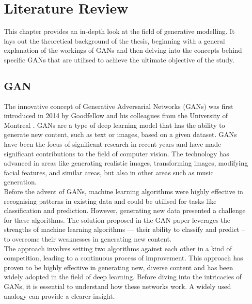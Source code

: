 \newpage
\section{Literature Review}
\label{section:literatureReviewChapter}
This chapter provides an in-depth look at the field of generative modelling. It lays out the theoretical background of the thesis, beginning with a general explanation of the workings of GANs and then delving into the concepts behind specific GANs that are utilised to achieve the ultimate objective of the study.

\subsection{GAN}
The innovative concept of Generative Adversarial Networks (GANs) was first introduced in 2014 by Goodfellow and his colleagues from the University of Montreal \cite{GANGoodfellow}. GANs are a type of deep learning model that has the ability to generate new content, such as text or images, based on a given dataset. GANs have been the focus of significant research in recent years and have made significant contributions to the field of computer vision. The technology has advanced in areas like generating realistic images, transforming images, modifying facial features, and similar areas, but also in other areas such as music generation.\\
Before the advent of GANs, machine learning algorithms were highly effective in recognising patterns in existing data and could be utilised for tasks like classification and prediction. However, generating new data presented a challenge for these algorithms. The solution proposed in the GAN paper leverages the strengths of machine learning algorithms — their ability to classify and predict – to overcome their weaknesses in generating new content.\\
The approach involves setting two algorithms against each other in a kind of competition, leading to a continuous process of improvement. This approach has proven to be highly effective in generating new, diverse content and has been widely adopted in the field of deep learning.
Before diving into the intricacies of GANs, it is essential to understand how these networks work. A widely used analogy can provide a clearer insight.\\
\\

